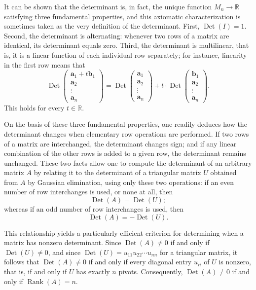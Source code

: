 It can be shown that the determinant is, in fact, the unique function $M_n \to \mathbb{R}$ satisfying three fundamental properties, and this axiomatic characterization is sometimes taken as the very definition of the determinant. First, $\operatorname{Det}(I) = 1$. Second, the determinant is alternating: whenever two rows of a matrix are identical, its determinant equals zero. Third, the determinant is multilinear, that is, it is a linear function of each individual row separately; for instance, linearity in the first row means that
\[
\operatorname{Det}\begin{pmatrix} \mathbf{a}_1 + t \mathbf{b}_1 \\ \mathbf{a}_2 \\ \vdots \\ \mathbf{a}_n \end{pmatrix} = \operatorname{Det}\begin{pmatrix} \mathbf{a}_1 \\ \mathbf{a}_2 \\ \vdots \\ \mathbf{a}_n \end{pmatrix} + t \cdot \operatorname{Det}\begin{pmatrix} \mathbf{b}_1 \\ \mathbf{a}_2 \\ \vdots \\ \mathbf{a}_n
\end{pmatrix}.
\]
This holds for every $t \in \mathbb{R}$.

On the basis of these three fundamental properties, one readily deduces how the determinant changes when elementary row operations are performed. If two rows of a matrix are interchanged, the determinant changes sign; and if any linear combination of the other rows is added to a given row, the determinant remains unchanged. These two facts allow one to compute the determinant of an arbitrary matrix $A$ by relating it to the determinant of a triangular matrix $U$ obtained from $A$ by Gaussian elimination, using only these two operations: if an even number of row interchanges is used, or none at all, then
\[
\operatorname{Det}(A) = \operatorname{Det}(U);
\]
whereas if an odd number of row interchanges is used, then
\[
\operatorname{Det}(A) = -\operatorname{Det}(U).
\]

This relationship yields a particularly efficient criterion for determining when a matrix has nonzero determinant. Since $\operatorname{Det}(A) \neq 0$ if and only if $\operatorname{Det}(U) \neq 0$, and since $\operatorname{Det}(U) = u_{11} u_{22} \cdots u_{nn}$ for a triangular matrix, it follows that $\operatorname{Det}(A) \neq 0$ if and only if every diagonal entry $u_{ii}$ of $U$ is nonzero, that is, if and only if $U$ has exactly $n$ pivots. Consequently, $\operatorname{Det}(A) \neq 0$ if and only if $\operatorname{Rank}(A) = n$.

